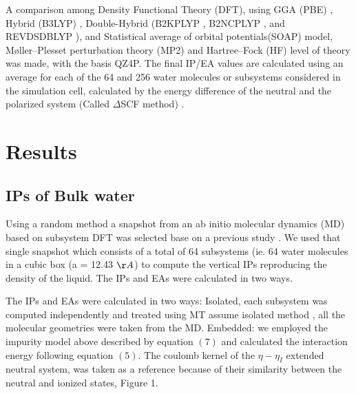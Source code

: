 \documentclass[12pt,a4paper]{article}
\begin{document}
A comparison among Density Functional Theory (DFT), using GGA (PBE) \cite{perdew1996phys}, Hybrid (B3LYP) \cite{hertwig1997parameterization},
Double-Hybrid (B2KPLYP \cite{yu2013intermolecular}, B2NCPLYP \cite{yu2014double}, and REVDSDBLYP \cite{kozuch2010dsd}),
and Statistical average of orbital potentials(SOAP) model\cite{schipper2000molecular, gritsenko1999approximation}, 
Møller–Plesset perturbation theory (MP2) \cite{head1988mp2} and Hartree–Fock (HF) \cite{marshall1961unrestricted} level of theory was made, with the basis QZ4P.
The final IP/EA values are calculated using an average for each of the 64 and 256 water molecules or subsystems considered in the simulation cell,
calculated by the energy difference of the neutral and the polarized system (Called $\Delta$SCF method) \cite{bagus1965self,waskom2017mwaskom}.

\section{Results}
\subsection{IPs of Bulk water}

Using a random method a snapshot from an ab initio molecular dynamics (MD) based on subsystem DFT was selected base on a
previous study \cite{genova2016avoiding}. We used that single snapshot which consists of a total of 64 subsystems
(ie. 64 water molecules in a cubic box (a = 12.43 $\AA$) to compute the vertical IPs reproducing the density of the liquid.
The IPs and EAs were calculated in two ways. 

The IPs and EAs were calculated in two ways: Isolated, each subsystem was computed independently and treated using MT
assume isolated method \cite{martyna1999reciprocal}, all the molecular geometries were taken from the MD. Embedded: 
we employed the impurity model above described by equation $(7)$ and calculated the interaction energy following 
equation $(5)$. The coulomb kernel of the $\eta -\eta_{I}$ extended neutral system, was taken as a reference because of
their similarity between the neutral and ionized states, Figure 1.
\end{document}
